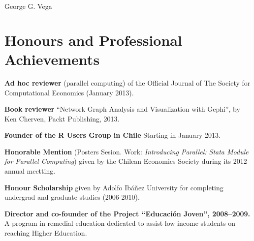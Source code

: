 \documentclass[letterpaper, 12pt]{article}
\def\name{George G. Vega}
\def\footerlink{http://www.ggvega.com}
\renewenvironment{itemize}{
  \begin{list}{}{
    \setlength{\leftmargin}{0.45cm}
  }
}{
  \end{list}
}
\begin{document}
{\huge \name}


\section*{Honours and Professional Achievements}

\begin{itemize}
\item \textbf{Ad hoc reviewer} (parallel computing) of the Official Journal of The Society for Computational Economics (January 2013).
\item \textbf{Book reviewer} ``Network Graph Analysis and Visualization with Gephi'', by Ken Cherven, Packt Publishing, 2013.
\item \textbf{Founder of the R Users Group in Chile} Starting in January 2013.
\item \textbf{Honorable Mention} (Posters Sesion. Work: \emph{Introducing Parallel: Stata Module for Parallel Computing}) given by the Chilean Economics Society during its 2012 annual meetting.
\item \textbf{Honour Scholarship} given by Adolfo Ib\'a\~nez University for completing undergrad and graduate studies (2006-2010).
\item \textbf{Director and co-founder of the Project ``Educaci\'on Joven'', 2008--2009.} A program in remedial education
 dedicated to assist low income students on reaching Higher Education.
\end{itemize}


\end{document}
